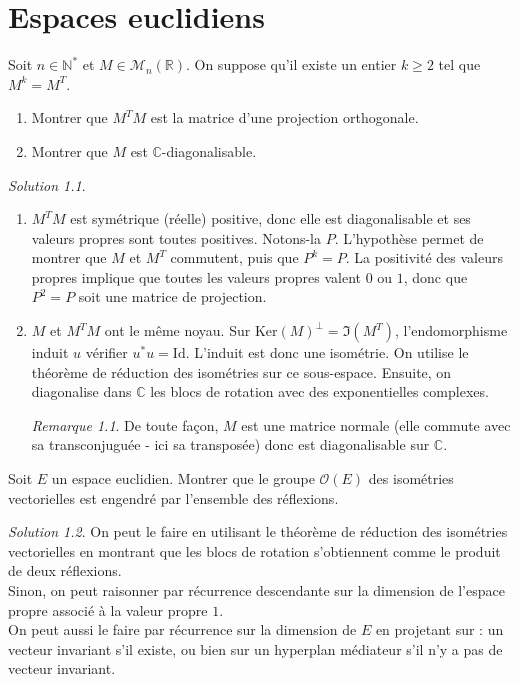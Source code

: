 \documentclass[french]{book}
\newcommand{\N}{\mathbb{N}}
\newcommand{\R}{\mathbb{R}}
\newcommand{\C}{\mathbb{C}}
\newcommand{\st}{^*}
\renewcommand{\ker}{\text{Ker}}
\newcommand{\Id}{\text{Id}}
\theoremstyle{definition}
\theoremstyle{remark}
\newtheorem*{sol}{Solution}
\newtheorem*{rmq}{Remarque}
\begin{document}
\chapter{Espaces euclidiens}

\begin{exo}[1]{}
	Soit $n\in\N\st$ et $M\in\mathcal{M}_n(\R)$. On suppose qu'il existe un entier $k\geqslant 2$ tel que $M^k=M^T$.
	\begin{enumerate}
		\item Montrer que $M^TM$ est la matrice d'une projection orthogonale.
		\item Montrer que $M$ est $\C$-diagonalisable.
	\end{enumerate}
\end{exo}
\begin{sol}
	\begin{enumerate}
		\item $M^TM$ est symétrique (réelle) positive, donc elle est diagonalisable et ses valeurs propres sont toutes positives. Notons-la $P$. L'hypothèse permet de montrer que $M$ et $M^T$ commutent, puis que $P^k=P$. La positivité des valeurs propres implique que toutes les valeurs propres valent $0$ ou $1$, donc que $P^2=P$ soit une matrice de projection.
		\item $M$ et $M^TM$ ont le même noyau. Sur $\ker(M)^\bot=\Im(M^T)$, l'endomorphisme induit $u$ vérifier $u\st u=\Id$. L'induit est donc une isométrie. On utilise le théorème de réduction des isométries sur ce sous-espace. Ensuite, on diagonalise dans $\C$ les blocs de rotation avec des exponentielles complexes.
		\begin{rmq}
			De toute façon, $M$ est une matrice normale (elle commute avec sa transconjuguée - ici sa transposée) donc est diagonalisable sur $\C$.
		\end{rmq}
	\end{enumerate}
\end{sol}

\begin{exo}[1]{}
	Soit $E$ un espace euclidien. Montrer que le groupe $\mathcal{O}(E)$ des isométries vectorielles est engendré par l'ensemble des réflexions.
\end{exo}
\begin{sol}
	On peut le faire en utilisant le théorème de réduction des isométries vectorielles en montrant que les blocs de rotation s'obtiennent comme le produit de deux réflexions. \\
	Sinon, on peut raisonner par récurrence descendante sur la dimension de l'espace propre associé à la valeur propre $1$.\\
	On peut aussi le faire par récurrence sur la dimension de $E$ en projetant sur : un vecteur invariant s'il existe, ou bien sur un hyperplan médiateur s'il n'y a pas de vecteur invariant.
\end{sol}
\end{document}

